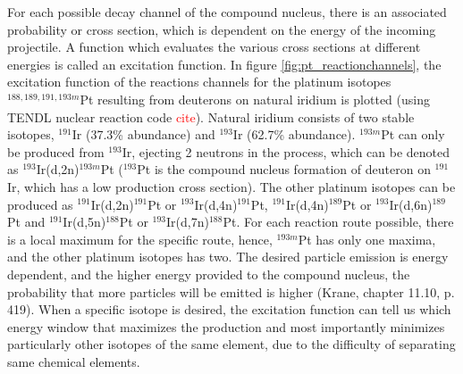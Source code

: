 \documentclass[a4paper,11pt,twoside]{book}
\begin{document}
\noindent For each possible decay channel of the compound nucleus, there is an associated probability or cross section, which is dependent on the energy of the incoming projectile. A function which evaluates the various cross sections at different energies is called an excitation function. In figure \ref{fig:pt_reactionchannels}, the excitation function of the reactions channels for the platinum isotopes $^{188, 189, 191,193m}$Pt resulting from deuterons on natural iridium is plotted (using TENDL nuclear reaction code \textcolor{red}{cite}). Natural iridium consists of two stable isotopes, $^{191}$Ir (37.3\% abundance) and $^{193}$Ir (62.7\% abundance). $^{193m}$Pt can only be produced from $^{193}$Ir, ejecting 2 neutrons in the process, which can be denoted as $^{193}$Ir(d,2n)$^{193m}$Pt ($^{193}$Pt is the compound nucleus formation of deuteron on $^{191}$Ir, which has a low production cross section). The other platinum isotopes can be produced as $^{191}$Ir(d,2n)$^{191}$Pt or $^{193}$Ir(d,4n)$^{191}$Pt, $^{191}$Ir(d,4n)$^{189}$Pt or $^{193}$Ir(d,6n)$^{189}$Pt and $^{191}$Ir(d,5n)$^{188}$Pt or $^{193}$Ir(d,7n)$^{188}$Pt. For each reaction route possible, there is a local maximum for the specific route, hence, $^{193m}$Pt has only one maxima, and the other platinum isotopes has two. The desired particle emission is energy dependent, and the higher energy provided to the compound nucleus, the probability that more particles will be emitted is higher (Krane, chapter 11.10, p. 419). When a specific isotope is desired, the excitation function can tell us which energy window that maximizes the production and most importantly minimizes particularly other isotopes of the same element, due to the difficulty of separating same chemical elements. \\
\end{document}
